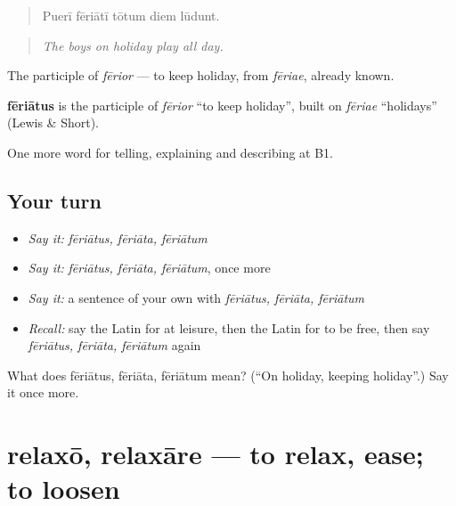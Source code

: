 \begin{quote}
Puerī fēriātī tōtum diem lūdunt.
\end{quote}

\begin{quote}
\emph{The boys on holiday play all day.}
\end{quote}

The participle of \emph{fērior} — to keep holiday, from \emph{fēriae}, already known.

\begin{cousinweb}
\textbf{fēriātus} is the participle of \emph{fērior} \textquotedblleft{}to keep holiday\textquotedblright{}, built on \emph{fēriae} \textquotedblleft{}holidays\textquotedblright{} (Lewis \& Short).
\end{cousinweb}

\begin{grammarlens}[title={What you've built}]
One more word for telling, explaining and describing at B1.
\end{grammarlens}

\subsection*{Your turn}
\begin{itemize}
\raggedright
  \item \emph{Say it:} \emph{fēriātus, fēriāta, fēriātum}
  \item \emph{Say it:} \emph{fēriātus, fēriāta, fēriātum}, once more
  \item \emph{Say it:} a sentence of your own with \emph{fēriātus, fēriāta, fēriātum}
  \item \emph{Recall:} say the Latin for at leisure, then the Latin for to be free, then say \emph{fēriātus, fēriāta, fēriātum} again
\end{itemize}

\begin{tcolorbox}[breakable,colback=teal!4,colframe=teal!35!black,title={Before you move on}]
What does fēriātus, fēriāta, fēriātum mean? (\textquotedblleft{}On holiday, keeping holiday\textquotedblright{}.) Say it once more.
\end{tcolorbox}
\section[relaxō, relaxāre]{relaxō, relaxāre — to relax, ease; to loosen}

\label{lesson:LA-C538-relaxo}



